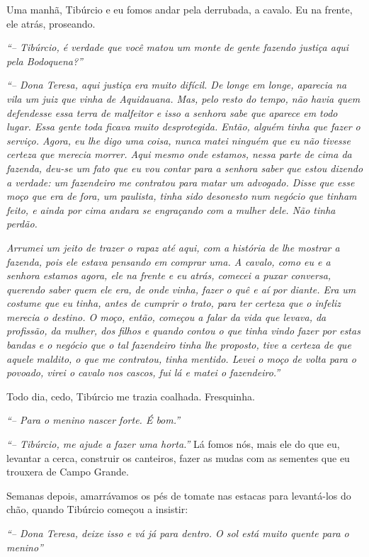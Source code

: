 Uma manhã, Tibúrcio e eu fomos andar pela derrubada, a cavalo.
Eu na frente, ele atrás, proseando.

\textit{``-- Tibúrcio, é verdade que você matou um monte de gente fazendo justiça aqui pela Bodoquena?'' }

\textit{``-- Dona Teresa, aqui justiça era muito difícil.
De longe em longe, aparecia na vila um juiz que vinha de Aquidauana.
Mas, pelo resto do tempo, não havia quem defendesse essa terra de malfeitor e isso a senhora sabe que aparece em todo lugar.
Essa gente toda ficava muito desprotegida.
Então, alguém tinha que fazer o serviço.
Agora, eu lhe digo uma coisa, nunca matei ninguém que eu não tivesse certeza que merecia morrer.
Aqui mesmo onde estamos, nessa parte de cima da fazenda, deu-se um fato que eu vou contar para a senhora saber que estou dizendo a verdade: 
um fazendeiro me contratou para matar um advogado.
Disse que esse moço que era de fora, um paulista, tinha sido desonesto num negócio que tinham feito, e ainda por cima andara se engraçando com a mulher dele.
Não tinha perdão.}

\textit{Arrumei um jeito de trazer o rapaz até aqui, com a história de lhe mostrar a fazenda, pois ele estava pensando em comprar uma.
A cavalo, como eu e a senhora estamos agora, ele na frente e eu atrás, comecei a puxar conversa, querendo saber quem ele era, de onde vinha, fazer o quê e aí por diante.
Era um costume que eu tinha, antes de cumprir o trato, para ter certeza que o infeliz merecia o destino.
O moço, então, começou a falar da vida que levava, da profissão, da mulher, dos filhos e quando contou o que tinha vindo fazer por estas bandas e o negócio que o tal fazendeiro tinha lhe proposto, tive a certeza de que aquele maldito, o que me contratou, tinha mentido.
Levei o moço de volta para o povoado, virei o cavalo nos cascos, fui lá e matei o fazendeiro.''}

Todo dia, cedo, Tibúrcio me trazia coalhada.
Fresquinha.

\textit{``-- Para o menino nascer forte. É bom.''}

\textit{``-- Tibúrcio, me ajude a fazer uma horta.''}
Lá fomos nós, mais ele do que eu, levantar a cerca, construir os canteiros, fazer as mudas com as sementes que eu trouxera de Campo Grande.

Semanas depois, amarrávamos os pés de tomate nas estacas para levantá-los do chão, quando Tibúrcio começou a insistir:

\textit{``-- Dona Teresa, deixe isso e vá já para dentro.
O sol está muito quente para o menino''}

